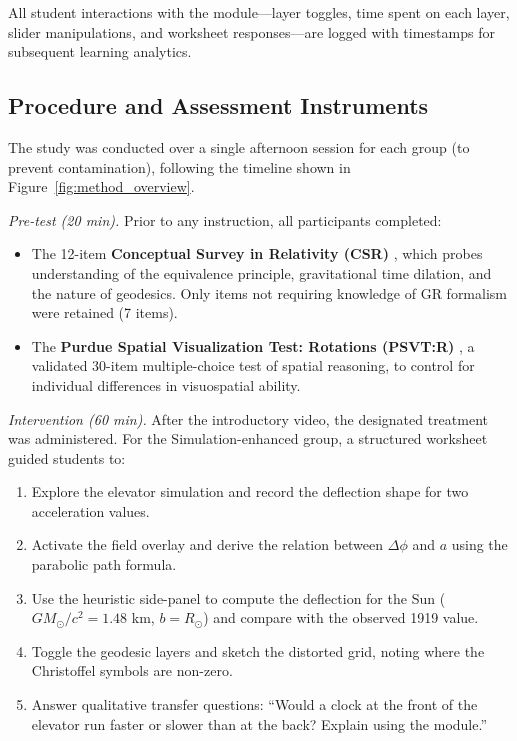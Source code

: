 \documentclass{article}
\begin{document}
All student interactions with the module—layer toggles, time spent on each layer, slider manipulations, and worksheet responses—are logged with timestamps for subsequent learning analytics.

\subsection{Procedure and Assessment Instruments}
\label{subsec:procedure}

The study was conducted over a single afternoon session for each group (to prevent contamination), following the timeline shown in Figure~\ref{fig:method_overview}.

\textit{Pre-test (20 min).} Prior to any instruction, all participants completed:
\begin{itemize}
    \item The 12-item \textbf{Conceptual Survey in Relativity (CSR)} \cite{aslanides2021relativity}, which probes understanding of the equivalence principle, gravitational time dilation, and the nature of geodesics. Only items not requiring knowledge of GR formalism were retained (7 items).
    \item The \textbf{Purdue Spatial Visualization Test: Rotations (PSVT:R)} \cite{guay1976}, a validated 30-item multiple-choice test of spatial reasoning, to control for individual differences in visuospatial ability.
\end{itemize}

\textit{Intervention (60 min).} After the introductory video, the designated treatment was administered. For the Simulation-enhanced group, a structured worksheet guided students to:
\begin{enumerate}
    \item Explore the elevator simulation and record the deflection shape for two acceleration values.
    \item Activate the field overlay and derive the relation between $\Delta\phi$ and $a$ using the parabolic path formula.
    \item Use the heuristic side-panel to compute the deflection for the Sun ($GM_\odot/c^2 = 1.48$ km, $b = R_\odot$) and compare with the observed 1919 value.
    \item Toggle the geodesic layers and sketch the distorted grid, noting where the Christoffel symbols are non-zero.
    \item Answer qualitative transfer questions: “Would a clock at the front of the elevator run faster or slower than at the back? Explain using the module.”
\end{enumerate}
\end{document}
